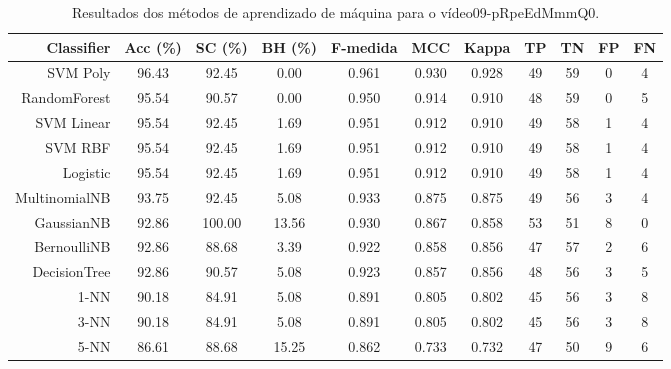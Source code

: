 \begin{table}[!htb]
\centering
\caption{Resultados dos métodos de aprendizado de máquina para o vídeo09-pRpeEdMmmQ0.}
\label{tab:09-pRpeEdMmmQ0}
\begin{tabular}{r|c|c|c|c|c|c|c|c|c|c}
\hline\hline
Classifier & Acc (\%) & SC (\%) & BH (\%) & F-medida & MCC & Kappa & TP & TN & FP & FN \\ \hline
SVM Poly & 96.43 & 92.45 & 0.00 & 0.961 & 0.930 & 0.928 & 49 & 59 & 0 & 4 \\ 
RandomForest & 95.54 & 90.57 & 0.00 & 0.950 & 0.914 & 0.910 & 48 & 59 & 0 & 5 \\ 
SVM Linear & 95.54 & 92.45 & 1.69 & 0.951 & 0.912 & 0.910 & 49 & 58 & 1 & 4 \\ 
SVM RBF & 95.54 & 92.45 & 1.69 & 0.951 & 0.912 & 0.910 & 49 & 58 & 1 & 4 \\ 
Logistic & 95.54 & 92.45 & 1.69 & 0.951 & 0.912 & 0.910 & 49 & 58 & 1 & 4 \\ 
MultinomialNB & 93.75 & 92.45 & 5.08 & 0.933 & 0.875 & 0.875 & 49 & 56 & 3 & 4 \\ 
GaussianNB & 92.86 & 100.00 & 13.56 & 0.930 & 0.867 & 0.858 & 53 & 51 & 8 & 0 \\ 
BernoulliNB & 92.86 & 88.68 & 3.39 & 0.922 & 0.858 & 0.856 & 47 & 57 & 2 & 6 \\ 
DecisionTree & 92.86 & 90.57 & 5.08 & 0.923 & 0.857 & 0.856 & 48 & 56 & 3 & 5 \\ 
1-NN & 90.18 & 84.91 & 5.08 & 0.891 & 0.805 & 0.802 & 45 & 56 & 3 & 8 \\ 
3-NN & 90.18 & 84.91 & 5.08 & 0.891 & 0.805 & 0.802 & 45 & 56 & 3 & 8 \\ 
5-NN & 86.61 & 88.68 & 15.25 & 0.862 & 0.733 & 0.732 & 47 & 50 & 9 & 6 \\ 
\hline\hline
\end{tabular}
\end{table}
